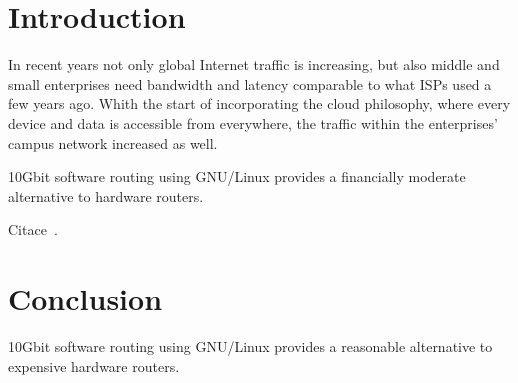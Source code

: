 
\chapter{Introduction}
In recent years not only global Internet traffic is increasing, but also middle and small enterprises
need bandwidth and latency comparable to what ISPs used a few years ago.
Whith the start of incorporating the cloud philosophy, where every device and data is accessible from everywhere,
the traffic within the enterprises' campus network increased as well.

10Gbit software routing using GNU/Linux provides a financially moderate alternative to hardware routers.

Citace~\cite{ipv6ready-db}.



%

%

%

%

%


\chapter{Conclusion}
10Gbit software routing using GNU/Linux provides a reasonable alternative to expensive hardware routers.
